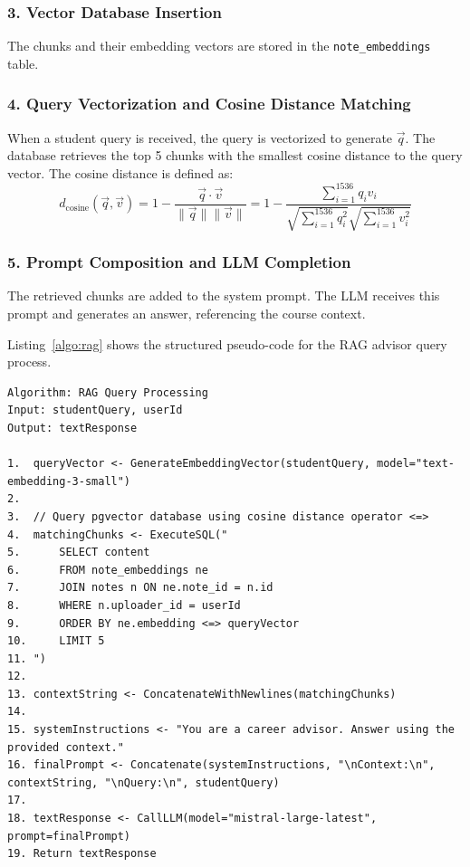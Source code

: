 \documentclass[12,Times new Roman,a4paper]{report}
\begin{document}
\subsubsection*{3. Vector Database Insertion}
The chunks and their embedding vectors are stored in the \texttt{note\_embeddings} table.

\subsubsection*{4. Query Vectorization and Cosine Distance Matching}
When a student query is received, the query is vectorized to generate $\vec{q}$. The database retrieves the top 5 chunks with the smallest cosine distance to the query vector. The cosine distance is defined as:
\begin{equation}
d_{\text{cosine}}(\vec{q}, \vec{v}) = 1 - \frac{\vec{q} \cdot \vec{v}}{\|\vec{q}\| \|\vec{v}\|} = 1 - \frac{\sum_{i=1}^{1536} q_i v_i}{\sqrt{\sum_{i=1}^{1536} q_i^2} \sqrt{\sum_{i=1}^{1536} v_i^2}}
\end{equation}

\subsubsection*{5. Prompt Composition and LLM Completion}
The retrieved chunks are added to the system prompt. The LLM receives this prompt and generates an answer, referencing the course context.

Listing~\ref{algo:rag} shows the structured pseudo-code for the RAG advisor query process.

\begin{verbatim}
Algorithm: RAG Query Processing
Input: studentQuery, userId
Output: textResponse

1.  queryVector <- GenerateEmbeddingVector(studentQuery, model="text-embedding-3-small")
2.  
3.  // Query pgvector database using cosine distance operator <=>
4.  matchingChunks <- ExecuteSQL("
5.      SELECT content 
6.      FROM note_embeddings ne
7.      JOIN notes n ON ne.note_id = n.id
8.      WHERE n.uploader_id = userId
9.      ORDER BY ne.embedding <=> queryVector
10.     LIMIT 5
11. ")
12. 
13. contextString <- ConcatenateWithNewlines(matchingChunks)
14. 
15. systemInstructions <- "You are a career advisor. Answer using the provided context."
16. finalPrompt <- Concatenate(systemInstructions, "\nContext:\n", contextString, "\nQuery:\n", studentQuery)
17. 
18. textResponse <- CallLLM(model="mistral-large-latest", prompt=finalPrompt)
19. Return textResponse
\end{verbatim}
\label{algo:rag}
\label{algo:rag}
\end{document}
